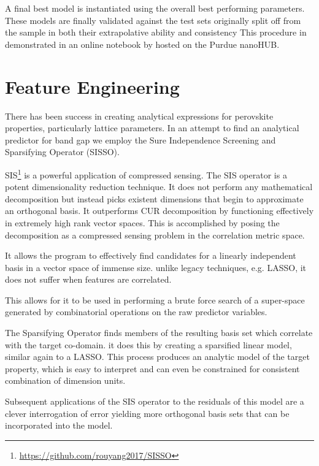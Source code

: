 A final best model is instantiated using the overall best performing parameters.
These models are finally validated against the test sets originally split off from the sample in both their extrapolative ability and consistency 
This procedure in demonstrated in an online notebook by \textcite{manganaris-2022-mrs-comput} hosted on the Purdue nanoHUB.

\section{Feature Engineering}
\label{sec:org4a6cc10}
There has been success in creating analytical expressions for perovskite properties, particularly lattice parameters.
\autocite{jiang-2006-predic-lattic} In an attempt to find an analytical predictor for band gap we employ the Sure Independence Screening and Sparsifying Operator (SISSO).
\autocite{ouyang-2018-sisso} 

SIS\footnote{\url{https://github.com/rouyang2017/SISSO}} is a powerful application of compressed sensing.
\autocite{ghiringhelli-2017-learn-physic}
The SIS operator is a potent dimensionality reduction technique.
It does not perform any mathematical decomposition but instead picks existent dimensions that begin to approximate an orthogonal basis.
It outperforms CUR decomposition by functioning effectively in extremely high rank vector spaces.
\autocite{ray-2021-various-dimen,hamm-2019-cur-decom}
This is accomplished by posing the decomposition as a compressed sensing problem in the correlation metric space.

It allows the program to effectively find candidates for a linearly independent basis in a vector space of immense size.
unlike legacy techniques, e.g.
LASSO, it does not suffer when features are correlated.
\autocite{tibshirani-1996-regres-shrin,gauraha-2018-introd-to-lasso}

This allows for it to be used in performing a brute force search of a super-space generated by combinatorial operations on the raw predictor variables.

The Sparsifying Operator finds members of the resulting basis set which correlate with the target co-domain.
it does this by creating a sparsified linear model, similar again to a LASSO.
This process produces an analytic model of the target property, which is easy to interpret and can even be constrained for consistent combination of dimension units.

Subsequent applications of the SIS operator to the residuals of this model are a clever interrogation of error yielding more orthogonal basis sets that can be incorporated into the model.
\autocite{mayo-1998-error-growt}


